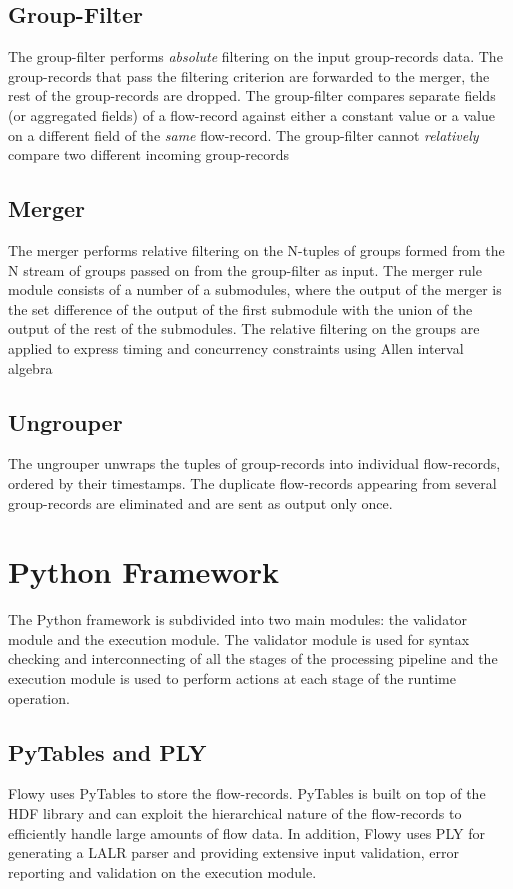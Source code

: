 \subsection{Group-Filter}\label{subsec:group-filter}
The group-filter performs \emph{absolute} filtering on the input group-records data. The group-records that pass the filtering criterion are forwarded to the merger, the rest of the group-records are dropped. The group-filter compares separate fields (or aggregated fields) of a flow-record against either a constant value or a value on a different field of the \emph{same} flow-record. The group-filter cannot \emph{relatively} compare two different incoming group-records

\subsection{Merger}\label{subsec:merger}
The merger performs relative filtering on the N-tuples of groups formed from the N stream of groups passed on from the group-filter as input. The merger rule module consists of a number of a submodules, where the output of the merger is the set difference of the output of the first submodule with the union of the output of the rest of the submodules. The relative filtering on the groups are applied to express timing and concurrency constraints using Allen interval algebra \cite{fallen:1983}

\subsection{Ungrouper}\label{subsec:ungrouper}
The ungrouper unwraps the tuples of group-records into individual flow-records, ordered by their timestamps. The duplicate flow-records appearing from several group-records are eliminated and are sent as output only once. 

\section{Python Framework}\label{sec:python-framework}

The Python framework is subdivided into two main modules: the validator module and the execution module. The validator module is used for syntax checking and interconnecting of all the stages of the processing pipeline and the execution module is used to perform actions at each stage of the runtime operation. 

\subsection{PyTables and PLY}\label{subsec:pytable-ply}
Flowy uses PyTables \cite{falted:2003} to store the flow-records. PyTables is built on top of the \ac{HDF} library and can exploit the hierarchical nature of the flow-records to efficiently handle large amounts of flow data. In addition, Flowy uses \ac{PLY} for generating a \ac{LALR} parser and providing extensive input validation, error reporting and validation on the execution module.

